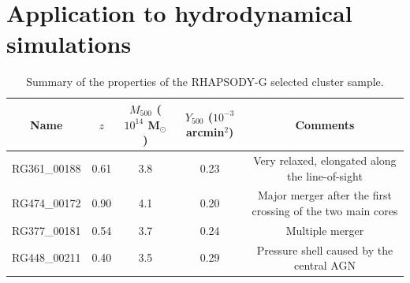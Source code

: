 \documentclass[twocolumn,traditabstract]{aa}
\begin{document}
\section{Application to hydrodynamical simulations}\label{sec:Application_to_hydrodynamical_simulations}
\begin{table}[]
\caption{\footnotesize{Summary of the properties of the RHAPSODY-G selected cluster sample.}}
\begin{center}
\begin{tabular}{c|c|c|c|c}
\hline
\hline
Name & $z$ & $M_{500}$ ($10^{14}$ M$_{\odot}$)& $Y_{500}$ ($10^{-3}$arcmin$^2$) & Comments \\
\hline
RG361\_00188 & 0.61 & 3.8 & 0.23 & Very relaxed, elongated along the line-of-sight \\ 
RG474\_00172 & 0.90 & 4.1 & 0.20 & Major merger after the first crossing of the two main cores \\ 
RG377\_00181 & 0.54 & 3.7 & 0.24 & Multiple merger \\
RG448\_00211 & 0.40 & 3.5 & 0.29 & Pressure shell caused by the central AGN \\ 
\hline
\end{tabular}
\end{center}
\label{tab:rhapsody_summary}
\end{table}
\end{document}
